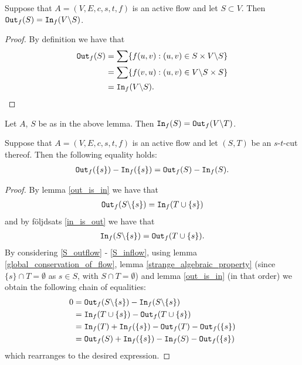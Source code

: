 \documentclass{article}
\begin{document}
\begin{lemma}\label{out_is_in}
    Suppose that $A = (V, E, c, s, t, f)$ is an active flow and let $S \subset V$. Then $\texttt{Out}_f(S) = \texttt{In}_f(V \backslash S)$.
\end{lemma}
\begin{proof}
    By definition we have that
    \begin{align*}
        \texttt{Out}_f(S) &= \sum \{f(u, v): (u, v) \in S \times V \backslash S\}\\
        &= \sum \{f(v, u): (u, v) \in V \backslash S \times S\}\\
        &= \texttt{In}_f(V \backslash S).
    \end{align*}
\end{proof}

\begin{foljdsats}\label{in_is_out}
    Let $A$, $S$ be as in the above lemma. Then $\texttt{In}_f(S) = \texttt{Out}_f(V \backslash T)$.
\end{foljdsats}

\begin{lemma}\label{flow_value_globalized}
    Suppose that $A = (V, E, c, s, t, f)$ is an active flow and let $(S, T)$ be an $s$-$t$-cut thereof. Then the following equality holds:
    \begin{align*}
        \texttt{Out}_f(\{s\}) - \texttt{In}_f(\{s\}) = \texttt{Out}_f(S) - \texttt{In}_f(S).
    \end{align*}
\end{lemma}
\begin{proof}
    By lemma \ref{out_is_in} we have that
    \begin{align}\label{S_outflow}
        \texttt{Out}_f(S \backslash \{s\}) = \texttt{In}_f(T \cup \{s\})
    \end{align}
    and by följdsats \ref{in_is_out} we have that
    \begin{align}\label{S_inflow}
        \texttt{In}_f(S \backslash \{s\}) = \texttt{Out}_f(T \cup \{s\}).
    \end{align}
    By considering \ref{S_outflow} - \ref{S_inflow}, using lemma \ref{global_conservation_of_flow}, lemma \ref{strange_algebraic_property} (since $\{s\} \cap T = \emptyset$ as $s \in S$, with $S \cap T = \emptyset$) and lemma \ref{out_is_in} (in that order) we obtain the following chain of equalities:
    \begin{align*}
        0 &= \texttt{Out}_f(S \backslash \{s\}) - \texttt{In}_f(S \backslash \{s\})\\
        &= \texttt{In}_f(T \cup \{s\}) - \texttt{Out}_f(T \cup \{s\})\\
        &= \texttt{In}_f(T) + \texttt{In}_f(\{s\}) - \texttt{Out}_f(T) - \texttt{Out}_f(\{s\})\\
        &= \texttt{Out}_f(S) + \texttt{In}_f(\{s\}) - \texttt{In}_f(S) - \texttt{Out}_f(\{s\})
    \end{align*}
    which rearranges to the desired expression.
\end{proof}
\end{document}

